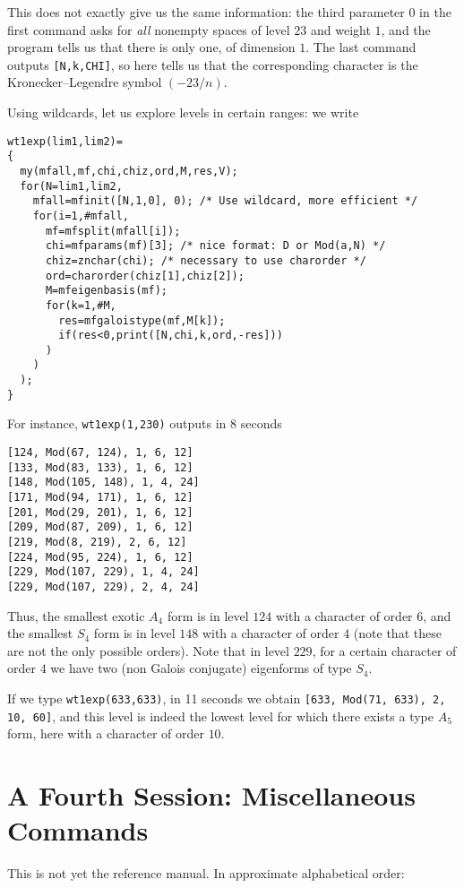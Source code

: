 \documentclass[11pt]{article}
\def\kbd#1{{\tt #1}}
\begin{document}
This does not exactly give us the same information: the third parameter $0$
in the first command asks for \emph{all} nonempty spaces of level $23$ and
weight $1$, and the program tells us that there is only one, of dimension $1$.
The last command outputs \kbd{[N,k,CHI]}, so here tells us that the
corresponding character is the Kronecker--Legendre symbol $(-23/n)$.

Using wildcards, let us explore levels in certain ranges: we write

\begin{verbatim}
wt1exp(lim1,lim2)=
{
  my(mfall,mf,chi,chiz,ord,M,res,V);
  for(N=lim1,lim2,
    mfall=mfinit([N,1,0], 0); /* Use wildcard, more efficient */
    for(i=1,#mfall,
      mf=mfsplit(mfall[i]);
      chi=mfparams(mf)[3]; /* nice format: D or Mod(a,N) */
      chiz=znchar(chi); /* necessary to use charorder */
      ord=charorder(chiz[1],chiz[2]);
      M=mfeigenbasis(mf);
      for(k=1,#M,
        res=mfgaloistype(mf,M[k]);
        if(res<0,print([N,chi,k,ord,-res]))
      )
    )
  );
}
\end{verbatim}

For instance, \kbd{wt1exp(1,230)} outputs in 8 seconds

\begin{verbatim}
[124, Mod(67, 124), 1, 6, 12]
[133, Mod(83, 133), 1, 6, 12]
[148, Mod(105, 148), 1, 4, 24]
[171, Mod(94, 171), 1, 6, 12]
[201, Mod(29, 201), 1, 6, 12]
[209, Mod(87, 209), 1, 6, 12]
[219, Mod(8, 219), 2, 6, 12]
[224, Mod(95, 224), 1, 6, 12]
[229, Mod(107, 229), 1, 4, 24]
[229, Mod(107, 229), 2, 4, 24]
\end{verbatim}

Thus, the smallest exotic $A_4$ form is in level $124$ with a character
of order $6$, and the smallest $S_4$ form is in level $148$ with a character
of order $4$ (note that these are not the only possible orders). Note that
in level $229$, for a certain character of order $4$ we have two (non Galois
conjugate) eigenforms of type $S_4$.

If we type \kbd{wt1exp(633,633)}, in 11 seconds we obtain
\kbd{[633, Mod(71, 633), 2, 10, 60]}, and this level is indeed the lowest
level for which there exists a type $A_5$ form, here with a character of order
$10$.

\section{A Fourth Session: Miscellaneous Commands}

This is not yet the reference manual. In approximate alphabetical order:
\end{document}

